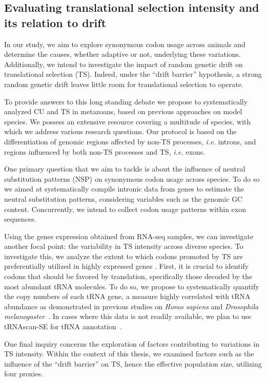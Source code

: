 \subsection{Evaluating translational selection intensity and its relation to drift}

In our study, we aim to explore synonymous \gls{codon} usage across animals and determine the causes, whether adaptive or not, underlying these variations. Additionally, we intend to investigate the impact of random genetic drift on \gls{translational selection} (\acrshort{TS}). Indeed, under the “drift barrier” hypothesis, a strong random genetic drift leaves little room for translational selection to operate. 

To provide answers to this long standing debate we propose to systematically analyzed \acrshort{CU} and \acrshort{TS} in metazoans, based on previous approaches on model species. We possess an extensive resource covering a multitude of species, with which we address various research questions. Our protocol is based on the differentiation of genomic regions affected by non-\acrshort{TS} processes, \textit{i.e.} introns, and regions influenced by both non-\acrshort{TS} processes and \acrshort{TS}, \textit{i.e.} exons.

One primary question that we aim to tackle is about the influence of neutral \gls{substitution} patterns (\acrshort{NSP}) on synonymous \gls{codon} usage across species. To do so we aimed at systematically compile intronic data from genes to estimate the neutral \gls{substitution} patterns, considering variables such as the genomic GC content. Concurrently, we intend to collect codon usage patterns within exon sequences.

Using the genes expression obtained from \acrshort{RNA}-seq samples, we can investigate another focal point: the variability in \acrshort{TS} intensity across diverse species. To investigate this, we analyze the extent to which codons promoted by \acrshort{TS} are preferentially utilized in highly expressed genes \citep{ikemura_correlation_1981, ikemura_codon_1985, duret_trna_2000}. First, it is crucial to identify codons that should be favored by translation, specifically those decoded by the most abundant \acrshort{tRNA} molecules. To do so, we propose to systematically quantify the copy numbers of each tRNA gene, a measure highly correlated with \acrshort{tRNA} abundance as demonstrated in previous studies on \textit{Homo sapiens} and \textit{Drosophila melanogaster}~\citep{behrens_high-resolution_2021}. In cases where this data is not readily available, we plan to use tRNAscan-SE for \acrshort{tRNA} annotation~\citep{chan_trnascan-se_2021}.

One final inquiry concerns the exploration of factors contributing to variations in \acrshort{TS} intensity. Within the context of this thesis, we examined factors such as the influence of the “drift barrier” on \acrshort{TS}, hence the effective population size, utilizing four proxies.
